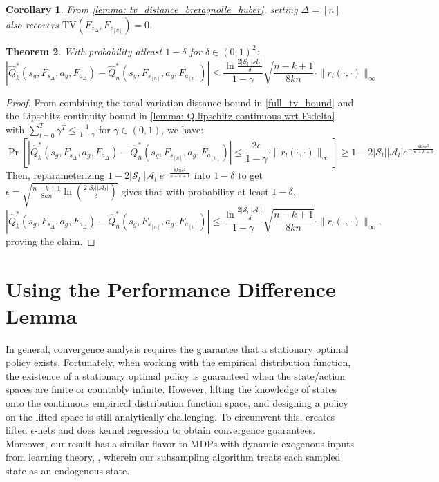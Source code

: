 \documentclass{article}
\theoremstyle{plain}
\newtheorem{theorem}{Theorem}[section]
\newtheorem{corollary}[theorem]{Corollary}
\theoremstyle{definition}
\begin{document}
\begin{corollary}
\emph{From \cref{lemma: tv_distance_bretagnolle_huber}, setting $\Delta=[n]$ also recovers $\mathrm{TV}(F_{z_\Delta},F_{z_{[n]}}) = 0$.}
\end{corollary}

\begin{theorem} \label{thm: combined lipschitz bound}With probability atleast $1-\delta$ for $\delta \in (0,1)^2$:
    \[\left|\hat{Q}_k^*(s_g,F_{s_{\Delta}},a_g,F_{a_\Delta}) - \hat{Q}_{n}^*(s_g, F_{s_{[n]}}, a_g, F_{a_{[n]}})\right| \leq \frac{\ln\frac{2|\mathcal{S}_l||\mathcal{A}_l|}{\delta}}{1-\gamma}\sqrt{\frac{n-k+1}{8kn}}\cdot\|r_l(\cdot,\cdot)\|_\infty\]
\end{theorem}
\begin{proof}
    From combining the total variation distance bound in \cref{full_tv_bound} and the Lipschitz continuity bound in \cref{lemma: Q lipschitz continuous wrt Fsdelta} with $\sum_{t=0}^T\gamma^T\leq \frac{1}{1-\gamma}$ for $\gamma\in(0,1)$, we have:
    \[\Pr\left[|\hat{Q}_k^*(s_g,F_{s_{\Delta}},a_g,F_{a_\Delta}) - \hat{Q}_{n}^*(s_g, F_{s_{[n]}}, a_g, F_{a_{[n]}})| \leq \frac{2\epsilon}{1-\gamma}\cdot\|r_l(\cdot,\cdot)\|_\infty\right] \geq 1 - 2|\mathcal{S}_l||\mathcal{A}_l|e^{-\frac{8kn\epsilon^2}{n-k+1}}\]
Then, reparameterizing $1-2|\mathcal{S}_l||\mathcal{A}_l|e^{-\frac{8kn\epsilon^2}{n-k+1}}$ into $1-\delta$ to get $\epsilon = \sqrt{\frac{n-k+1}{8kn} \ln \left(\frac{2|\mathcal{S}_l||\mathcal{A}_l|}{\delta}\right)}$ gives that with probability at least $1-\delta$,
    \[\left|\hat{Q}_k^*(s_g,F_{s_{\Delta}},a_g,F_{a_\Delta}) - \hat{Q}_{n}^*(s_g, F_{s_{[n]}}, a_g, F_{a_{[n]}})\right| \leq \frac{\ln\frac{2|\mathcal{S}_l||\mathcal{A}_l|}{\delta}}{1-\gamma}\sqrt{\frac{n-k+1}{8kn}}\cdot\|r_l(\cdot,\cdot)\|_\infty,\]
proving the claim.\qedhere
\end{proof}


\section{Using the Performance Difference Lemma}
\label{using pdl}
In general, convergence analysis requires the guarantee that a stationary optimal policy exists.
Fortunately, when working with the empirical distribution function, the existence of a stationary optimal policy is guaranteed when the state/action spaces are finite or countably infinite. However, lifting the knowledge of states onto the continuous empirical distribution function space, and designing a policy on the lifted space is still analytically challenging. To circumvent this, \cite{doi:10.1137/20M1360700} creates lifted $\epsilon$-nets and does kernel regression to obtain convergence guarantees. Moreover, our result has a similar flavor to MDPs with dynamic exogenous inputs from learning theory, \citep{dietterich2018discoveringremovingexogenousstate,foster2022on,anand2024efficient}, wherein our subsampling algorithm treats each sampled state as an endogenous state.
\end{document}
